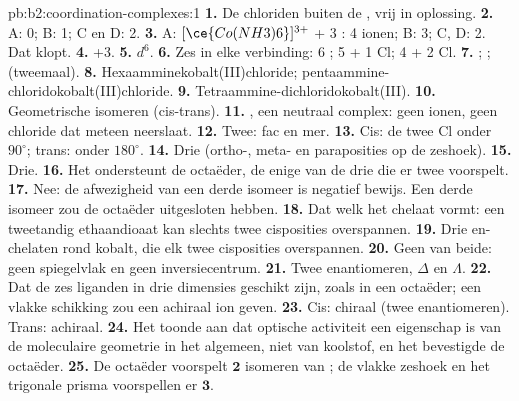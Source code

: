 \begin{solution}{pb:b2:coordination-complexes:1}
\textbf{1.} De chloriden buiten de , vrij in oplossing.
\textbf{2.} A: 0; B: 1; C en D: 2.
\textbf{3.} A: $[\ce{Co(NH3)6}]^{3+}$ + 3 : 4 ionen; B: 3; C, D: 2. Dat klopt.
\textbf{4.} +3.
\textbf{5.} $d^6$.
\textbf{6.} Zes in elke verbinding: 6 ; 5  + 1 Cl; 4  + 2 Cl.
\textbf{7.} ; ;  (tweemaal).
\textbf{8.} Hexaamminekobalt(III)chloride; pentaammine-chloridokobalt(III)chloride.
\textbf{9.} Tetraammine-dichloridokobalt(III).
\textbf{10.} Geometrische isomeren (cis-trans).
\textbf{11.} \ce{[CoCl3(NH3)3]}, een neutraal complex: geen ionen, geen chloride dat meteen
neerslaat.
\textbf{12.} Twee: fac en mer.
\textbf{13.} Cis: de twee Cl onder $90^\circ$; trans: onder $180^\circ$.
\textbf{14.} Drie (ortho-, meta- en paraposities op de zeshoek).
\textbf{15.} Drie.
\textbf{16.} Het ondersteunt de octaëder, de enige van de drie die er twee voorspelt.
\textbf{17.} Nee: de afwezigheid van een derde isomeer is negatief bewijs. Een derde isomeer zou
de octaëder uitgesloten hebben.
\textbf{18.} Dat welk het chelaat vormt: een tweetandig ethaandioaat kan slechts twee
cisposities overspannen.
\textbf{19.} Drie en-chelaten rond kobalt, die elk twee cisposities overspannen.
\textbf{20.} Geen van beide: geen spiegelvlak en geen inversiecentrum.
\textbf{21.} Twee enantiomeren, $\Delta$ en $\Lambda$.
\textbf{22.} Dat de zes liganden in drie dimensies geschikt zijn, zoals in een
octaëder; een vlakke schikking zou een achiraal ion geven.
\textbf{23.} Cis: chiraal (twee enantiomeren). Trans: achiraal.
\textbf{24.} Het toonde aan dat optische activiteit een eigenschap is van de moleculaire geometrie in het algemeen,
niet van koolstof, en het bevestigde de octaëder.
\textbf{25.} De octaëder voorspelt $\boldsymbol{2}$ isomeren van \ce{[CoCl2(NH3)4]+}; de
vlakke zeshoek en het trigonale prisma voorspellen er $\boldsymbol{3}$.
\end{solution}
